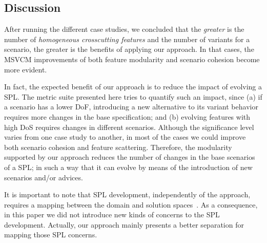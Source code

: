 \documentclass{sig-alternate}
\begin{document}
\subsection{Discussion}

After running the different case studies, we concluded that the 
\emph{greater} is the number of \emph{homogeneous crosscutting features} and
the number of variants for a scenario, the greater is the 
benefits of applying our approach. In that cases, the MSVCM improvements of 
both feature modularity and scenario cohesion become more evident. 

In fact, the expected benefit of our approach is to reduce the impact of evolving
a SPL. The metric suite presented here tries to quantify such an impact, since
(a) if a scenario has a lower DoF, introducing a new alternative to its variant
behavior requires more changes in the base specification; and (b) evolving
features with high DoS requires changes in different scenarios. Although the
significance level varies from one case study to another, in most of the cases we
could improve both scenario cohesion and feature scattering. Therefore, the
modularity supported by our approach reduces the number of changes in the base
scenarios of a SPL; in such a way that it can evolve by means of the
introduction of new scenarios and/or advices.

It is important to note that SPL development, independently of the approach, requires a
mapping between the domain and solution spaces~\cite{Czarnecki:2000aa,Jayaraman:2007aa}. As a
consequence, in this paper we did not introduce new kinds of concerns to the SPL
development. Actually, our approach mainly presents a better separation for
mapping those SPL concerns. 
\end{document}
